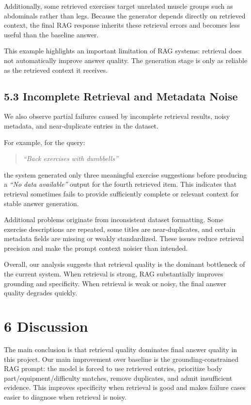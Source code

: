 \documentclass[fleqn,moreauthors,10pt]{ds_report}
\begin{document}
Additionally, some retrieved exercises target unrelated muscle groups such as abdominals rather than legs. Because the generator depends directly on retrieved context, the final RAG response inherits these retrieval errors and becomes less useful than the baseline answer.

This example highlights an important limitation of RAG systems: retrieval does not automatically improve answer quality. The generation stage is only as reliable as the retrieved context it receives.

\subsection*{5.3 Incomplete Retrieval and Metadata Noise}

We also observe partial failures caused by incomplete retrieval results, noisy metadata, and near-duplicate entries in the dataset.

For example, for the query:

\begin{quote}
\emph{``Back exercises with dumbbells''}
\end{quote}

the system generated only three meaningful exercise suggestions before producing a \emph{``No data available''} output for the fourth retrieved item. This indicates that retrieval sometimes fails to provide sufficiently complete or relevant context for stable answer generation.

Additional problems originate from inconsistent dataset formatting. Some exercise descriptions are repeated, some titles are near-duplicates, and certain metadata fields are missing or weakly standardized. These issues reduce retrieval precision and make the prompt context noisier than intended.

Overall, our analysis suggests that retrieval quality is the dominant bottleneck of the current system. When retrieval is strong, RAG substantially improves grounding and specificity. When retrieval is weak or noisy, the final answer quality degrades quickly.

\section*{6 Discussion}

The main conclusion is that retrieval quality dominates final answer quality in this project. Our main improvement over baseline is the grounding-constrained RAG prompt: the model is forced to use retrieved entries, prioritize body part/equipment/difficulty matches, remove duplicates, and admit insufficient evidence. This improves specificity when retrieval is good and makes failure cases easier to diagnose when retrieval is noisy.
\end{document}
